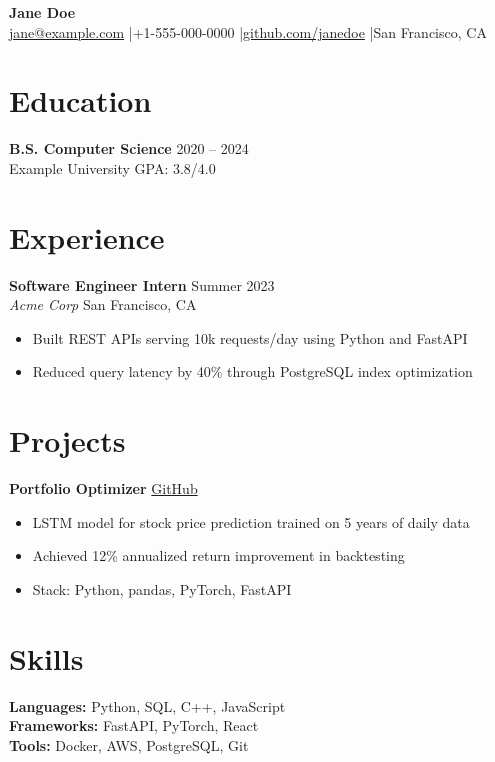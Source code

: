 \documentclass[11pt,a4paper]{article}
\begin{document}
{\centering
  {\LARGE\bfseries Jane Doe} \\[4pt]
  \href{mailto:jane@example.com}{jane@example.com}
  \enspace|\enspace +1-555-000-0000
  \enspace|\enspace \href{https://github.com/janedoe}{github.com/janedoe}
  \enspace|\enspace San Francisco, CA \\
\par}
\vspace{6pt}

\section{Education}
\textbf{B.S. Computer Science} \hfill 2020 -- 2024 \\
Example University \hfill GPA: 3.8/4.0

\section{Experience}
\textbf{Software Engineer Intern} \hfill Summer 2023 \\
\textit{Acme Corp} \hfill San Francisco, CA
\begin{itemize}
  \item Built REST APIs serving 10k requests/day using Python and FastAPI
  \item Reduced query latency by 40\% through PostgreSQL index optimization
\end{itemize}

\section{Projects}
\textbf{Portfolio Optimizer} \hfill \href{https://github.com/janedoe/portfolio-opt}{GitHub}
\begin{itemize}
  \item LSTM model for stock price prediction trained on 5 years of daily data
  \item Achieved 12\% annualized return improvement in backtesting
  \item Stack: Python, pandas, PyTorch, FastAPI
\end{itemize}

\section{Skills}
\textbf{Languages:} Python, SQL, C++, JavaScript \\
\textbf{Frameworks:} FastAPI, PyTorch, React \\
\textbf{Tools:} Docker, AWS, PostgreSQL, Git

\end{document}
